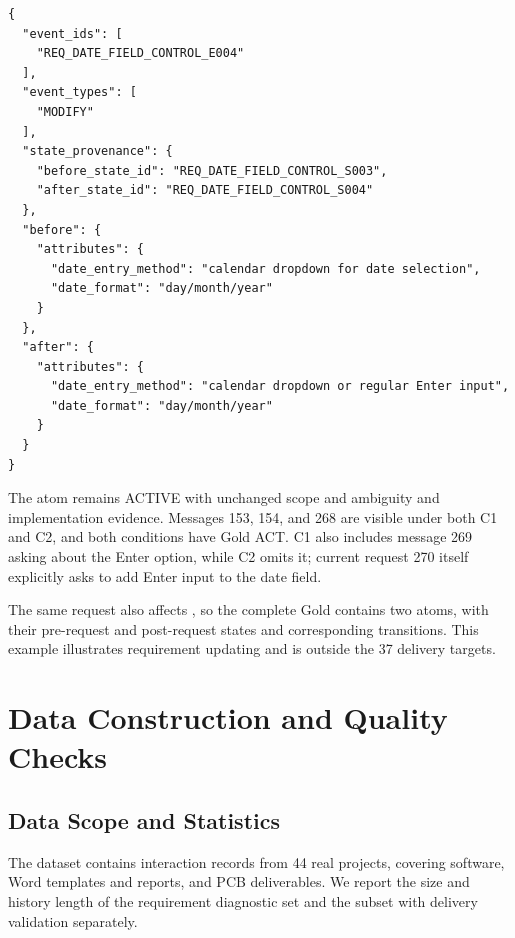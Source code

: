 \documentclass{article} %
\begin{document}
\begin{Verbatim}[fontsize=\normalsize,breaklines=true,breakanywhere=true]
{
  "event_ids": [
    "REQ_DATE_FIELD_CONTROL_E004"
  ],
  "event_types": [
    "MODIFY"
  ],
  "state_provenance": {
    "before_state_id": "REQ_DATE_FIELD_CONTROL_S003",
    "after_state_id": "REQ_DATE_FIELD_CONTROL_S004"
  },
  "before": {
    "attributes": {
      "date_entry_method": "calendar dropdown for date selection",
      "date_format": "day/month/year"
    }
  },
  "after": {
    "attributes": {
      "date_entry_method": "calendar dropdown or regular Enter input",
      "date_format": "day/month/year"
    }
  }
}
\end{Verbatim}

The atom remains ACTIVE with unchanged scope and  ambiguity and implementation evidence. Messages 153, 154, and 268 are visible under both C1 and C2, and both conditions have Gold ACT. C1 also includes message 269 asking about the Enter option, while C2 omits it; current request 270 itself explicitly asks to add Enter input to the date field.

The same request also affects , so the complete Gold contains two atoms, with their pre-request and post-request states and corresponding transitions. This example illustrates requirement updating and is outside the 37 delivery targets.

\FloatBarrier
\section{Data Construction and Quality Checks}
\label{app:b}

\FloatBarrier
\subsection{Data Scope and Statistics}
\label{app:b1}

The dataset contains interaction records from 44 real projects, covering software, Word templates and reports, and PCB deliverables. We report the size and history length of the requirement diagnostic set and the subset with delivery validation separately.
\end{document}
